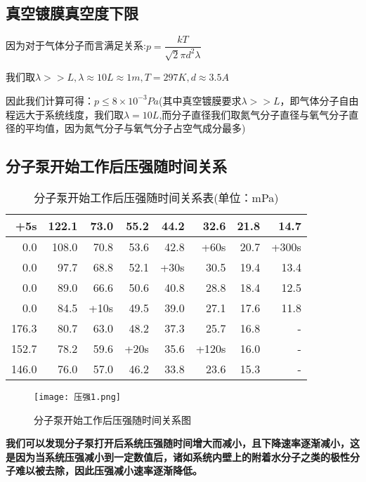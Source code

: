 \documentclass[UTF8]{ctexart}
\begin{document}
	\subsection{真空镀膜真空度下限}
	因为对于气体分子而言满足关系:$p=\dfrac{kT}{\sqrt{2}\pi d^{2}\lambda}$
	\par 我们取$\lambda>>L,\lambda\approx10L\approx1m,T=297K,d\approx3.5A$
	\par 因此我们计算可得：$p\le 8\times10^{-3}Pa$(其中真空镀膜要求$\lambda>>L$，即气体分子自由程远大于系统线度，我们取$\lambda=10L$,而分子直径我们取氮气分子直径与氧气分子直径的平均值，因为氮气分子与氧气分子占空气成分最多)
	\subsection{分子泵开始工作后压强随时间关系}
	\begin{table}[H]
		\centering
		\caption{分子泵开始工作后压强随时间关系表(单位：mPa)}
		\begin{tabular}{|r|r|r|r|r|r|r|r|}
			\toprule[0.5mm]
			+5s & 122.1 & 73.0    & 55.2  & 44.2  & 32.6  & 21.8  & 14.7 \\
			\hline
			0.0     & 108.0   & 70.8  & 53.6  & 42.8  & +60s & 20.7  & +300s \\
			\hline
			0.0     & 97.7  & 68.8  & 52.1  & +30s & 30.5  & 19.4  & 13.4 \\
			\hline
			0.0     & 89.0    & 66.6  & 50.6  & 40.8  & 28.8  & 18.4  & 12.5 \\
			\hline
			0.0     & 84.5  & +10s & 49.5  & 39.0    & 27.1  & 17.6  & 11.8 \\
			\hline
			176.3 & 80.7  & 63.0    & 48.2  & 37.3  & 25.7  & 16.8  & - \\
			\hline
			152.7 & 78.2  & 59.6  & +20s & 35.6  & +120s & 16.0    &  -\\
			\hline
			146.0   & 76.0    & 57.0    & 46.2  & 33.8  & 23.6  & 15.3  &-  \\
			\bottomrule[0.5mm]
		\end{tabular}
	\end{table}
	\begin{figure}[H]
		\begin{center}
			\texttt{[image: 压强1.png]}
			\caption{分子泵开始工作后压强随时间关系图}
		\end{center}
	\end{figure}
\par \textbf{我们可以发现分子泵打开后系统压强随时间增大而减小，且下降速率逐渐减小，这是因为当系统压强减小到一定数值后，诸如系统内壁上的附着水分子之类的极性分子难以被去除，因此压强减小速率逐渐降低。}
\end{document}
